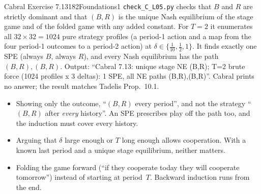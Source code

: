 \begin{exsol}{Cabral Exercise 7.13}{182}{Foundations}{1}
\verify \texttt{check\_C\_L05.py} checks that $B$ and $R$ are strictly dominant and that $(B,R)$ is
the unique Nash equilibrium of the stage game and of the folded game with any added constant. For
$T = 2$ it enumerates all $32 \times 32 = 1024$ pure strategy profiles (a period-1 action and a map
from the four period-1 outcomes to a period-2 action) at $\delta \in \{\frac1{10}, \frac12, 1\}$. It
finds exactly one SPE (always $B$, always $R$), and every Nash equilibrium has the path
$(B,R),(B,R)$. Output: ``Cabral 7.13: unique stage NE (B,R); T=2 brute force (1024 profiles x 3
deltas): 1 SPE, all NE paths (B,R),(B,R)''. Cabral prints no answer; the result matches Tadelis
Prop.~10.1.

\mistakes
\begin{itemize}
  \item Showing only the outcome, ``$(B,R)$ every period'', and not the strategy ``$(B,R)$ after
  \emph{every} history''. An SPE prescribes play off the path too, and the induction must cover every
  history.
  \item Arguing that $\delta$ large enough or $T$ long enough allows cooperation. With a known last
  period and a unique stage equilibrium, neither matters.
  \item Folding the game forward (``if they cooperate today they will cooperate tomorrow'') instead
  of starting at period~$T$. Backward induction runs from the end.
\end{itemize}

\end{exsol}
